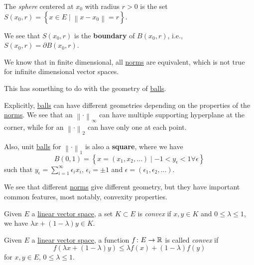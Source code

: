 \begin{definition}[Sphere]\label{def:sphere}
	The \emph{sphere} centered at \(x_0\) with radius \(r>0\) is the set \(S(x_0, r) = \left\{ x\in E\mid \left\lVert x - x_0\right\rVert = r\right\} \).
\end{definition}

\begin{remark}
	We see that \(S(x_0, r)\) is the \textbf{boundary} of \(B(x_0, r)\), i.e., \(S(x_0, r) = \partial B(x_0, r)\).
\end{remark}

\begin{note}
	We know that in finite dimensional, all \hyperref[def:norm]{norms} are equivalent, which is not true for infinite dimensional vector spaces.

	This has something to do with the geometry of \hyperref[def:ball]{balls}.
\end{note}

Explicitly, \hyperref[def:ball]{balls} can have different geometries depending on the properties of the \hyperref[def:norm]{norms}. We see that an \(\left\lVert \cdot\right\rVert _{\infty}\) can have multiple supporting hyperplane at the corner, while for an \(\left\lVert \cdot\right\rVert _2\) can have only one at each point.

Also, unit \hyperref[def:ball]{balls} for \(\left\lVert \cdot\right\rVert _1\) is also a \textbf{square}, where we have
\[
	B(0, 1) = \left\{ x = (x_1, x_2, \ldots)\mid -1 < y_{\epsilon } < 1 \forall \epsilon\right\}
\]
such that \(y_{\epsilon } = \sum_{i=1}^{\infty} \epsilon _i x_i \), \(\epsilon _i = \pm 1\) and \(\epsilon = (\epsilon _1, \epsilon _2, \ldots  )\).

We see that different \hyperref[def:norm]{norms} give different geometry, but they have important common features, most notably, convexity properties.

\begin{definition}\label{def:convex-set}
	Given \(E\) a \hyperref[def:linear-vector-space]{linear vector space}, a set \(K\subset E\) is \emph{convex} if \(x, y\in K\) and \(0 \leq \lambda \leq 1\), we have \(\lambda x + (1 - \lambda )y\in K\).
\end{definition}

\begin{definition}\label{def:convex-function}
	Given \(E\) a \hyperref[def:linear-vector-space]{linear vector space}, a function \(f\colon E\to \mathbb{\MakeUppercase{r}} \) is called \emph{convex} if
	\[
		f(\lambda x + (1 - \lambda )y) \leq \lambda f(x) + (1 - \lambda )f(y)
	\]
	for \(x, y\in E\), \(0 \leq \lambda \leq 1\).
\end{definition}

